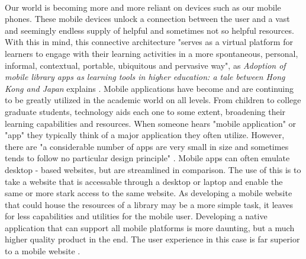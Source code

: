 \paragraph{}
 Our world is becoming more and more reliant on devices such as our mobile phones. These mobile devices unlock a connection between the user and a vast and seemingly endless supply of helpful and sometimes not so helpful resources. With this in mind, this connective architecture "serves as a virtual platform for learners to engage with their learning activities in a more spontaneous, personal, informal, contextual, portable, ubiquitous and pervasive way", as \textit{Adoption of mobile library apps as learning tools in higher education: a tale between Hong Kong and Japan} explains \cite{Mobile_Apps_Between_Hong_Kong_and_Japan}. Mobile applications have become and are continuing to be greatly utilized in the academic world on all levels. From children to college graduate students, technology aids each one to some extent, broadening their learning capabilities and resources. When someone hears "mobile application" or "app" they typically think of a major application they often utilize. However, there are "a considerable number of apps are very small in size and sometimes tends to follow no particular design principle" \cite{Challenges_in_Mobile_Apps}. Mobile apps can often emulate desktop - based websites, but are streamlined in comparison. The use of this is to take a website that is accessable through a desktop or laptop and enable the same or more stark access to the same website. As developing a mobile website that could house the resources of a library may be a more simple task, it leaves for less capabilities and utilities for the mobile user. Developing a native application that can support all mobile platforms is more daunting, but a much higher quality product in the end. The user experience in this case is far superior to a mobile website \cite{misodi}.
 
